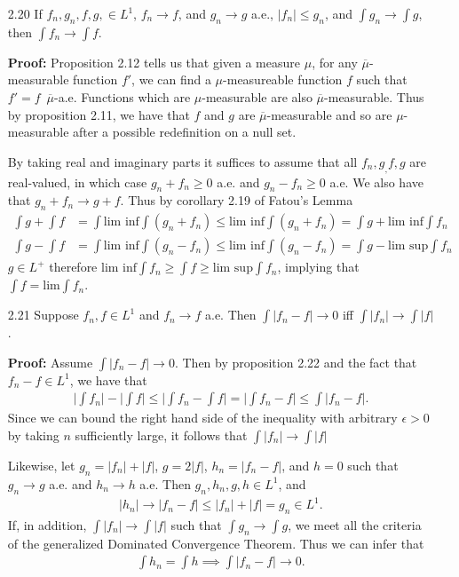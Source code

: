\documentclass[11pt,letter]{article}
\begin{document}
\begin{enumerate}
    \item[2.20] If $f_n, g_n, f, g, \in L^1$, $f_n \rightarrow f$, and $g_n \rightarrow g$ a.e., $|f_n| \le g_n$, and $\int g_n \rightarrow \int g$, then $\int f_n \rightarrow \int f$.
    
    \textbf{Proof:} Proposition 2.12 tells us that given a measure $\mu$, for any $\overline{\mu}$-measurable function $f'$, we can find a $\mu$-measureable function $f$ such that $f' = f$\ $\overline{\mu}$-a.e. Functions which are $\mu$-measurable are also $\overline{\mu}$-measurable. Thus by proposition 2.11, we have that $f$ and $g$ are $\overline{\mu}$-measurable and so are $\mu$-measurable after a possible redefinition on a null set.

    By taking real and imaginary parts it suffices to assume that all $f_n,g_,f,g$ are real-valued, in which case $g_n + f_n \ge 0$ a.e. and $g_n - f_n \ge 0$ a.e. We also have that $g_n + f_n \rightarrow g + f$. Thus by corollary 2.19 of Fatou's Lemma
    \begin{align*}
        \int g + \int f & = \int \text{lim inf} \int (g_n + f_n) \le \text{lim inf} \int(g_n + f_n) = \int g + \text{lim inf} \int f_n \\
        \int g - \int f & = \int \text{lim inf} \int (g_n - f_n) \le \text{lim inf} \int(g_n - f_n) = \int g - \text{lim sup} \int f_n
    \end{align*}
    $g \in L^+$ therefore $\text{lim inf} \int f_n \ge \int f \ge \text{lim sup} \int f_n$, implying that $\int f = \text{lim} \int f_n$.
    
    \item[2.21] Suppose $f_n, f \in L^1$ and $f_n \rightarrow f$ a.e. Then $\int |f_n - f| \rightarrow 0$ iff $\int |f_n| \rightarrow \int |f|$.
    
    \textbf{Proof:} Assume $\int |f_n - f| \rightarrow 0$. Then by proposition 2.22 and the fact that $f_n - f \in L^1$, we have that
    \begin{align*}
        \Big| \int f_n \Big| - \Big| \int f \Big| \le \Big| \int f_n - \int f \Big| = \Big|\int f_n - f \Big| \le \int |f_n - f|.
    \end{align*}
    Since we can bound the right hand side of the inequality with arbitrary $\epsilon > 0$ by taking $n$ sufficiently large, it follows that $\int |f_n| \rightarrow \int |f|$

    Likewise, let $g_n = |f_n| + |f| $, $g = 2|f|$, $h_n = |f_n - f|$, and $h = 0$ such that $g_n \rightarrow g$ a.e. and $h_n \rightarrow h$ a.e. Then $g_n,h_n,g,h \in L^1$, and
    \begin{align*}
        |h_n| \rightarrow |f_n - f| \le |f_n| + |f| = g_n \in L^1.
    \end{align*} 
    If, in addition, $\int |f_n| \rightarrow \int |f|$ such that $\int g_n \rightarrow \int g$, we meet all the criteria of the generalized Dominated Convergence Theorem. Thus we can infer that
    \begin{align*}
        \int h_n = \int h \implies \int |f_n - f| \rightarrow 0.
    \end{align*}


\end{enumerate}
\end{document}

